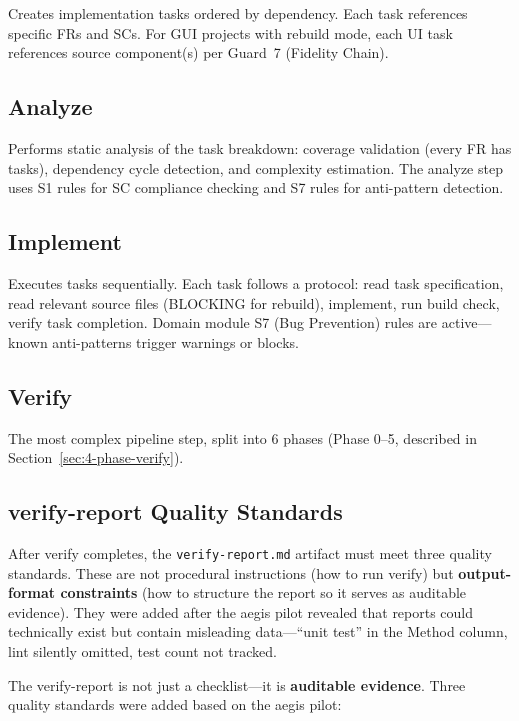 \documentclass[11pt,a4paper,openright,twoside]{report}
\newcommand{\file}[1]{\texttt{#1}}
\begin{document}
Creates implementation tasks ordered by dependency. Each task references specific FRs and SCs. For GUI projects with rebuild mode, each UI task references source component(s) per Guard~7 (Fidelity Chain).

\subsection{Analyze}

Performs static analysis of the task breakdown: coverage validation (every FR has tasks), dependency cycle detection, and complexity estimation. The analyze step uses S1 rules for SC compliance checking and S7 rules for anti-pattern detection.

\subsection{Implement}

Executes tasks sequentially. Each task follows a protocol: read task specification, read relevant source files (BLOCKING for rebuild), implement, run build check, verify task completion. Domain module S7 (Bug Prevention) rules are active---known anti-patterns trigger warnings or blocks.

\subsection{Verify}

The most complex pipeline step, split into 6 phases (Phase 0--5, described in Section~\ref{sec:4-phase-verify}).

\subsection{verify-report Quality Standards}

After verify completes, the \file{verify-report.md} artifact must meet three quality standards. These are not procedural instructions (how to run verify) but \textbf{output-format constraints} (how to structure the report so it serves as auditable evidence). They were added after the aegis pilot revealed that reports could technically exist but contain misleading data---``unit test'' in the Method column, lint silently omitted, test count not tracked.

The verify-report is not just a checklist---it is \textbf{auditable evidence}. Three quality standards were added based on the aegis pilot:
\end{document}
